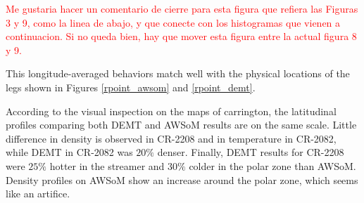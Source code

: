 \documentclass[namedreferences]{solarphysics}
\def\diego#1{\textcolor{red}{#1}}
\begin{document}
\begin{article}
\diego{Me gustaria hacer un comentario de cierre para esta figura que refiera las Figuras 3 y 9, como la linea de abajo, y que conecte con los histogramas que vienen a continuacion. Si no queda bien, hay que mover esta figura entre la actual figura 8 y 9.}

This longitude-averaged behaviors match well with the physical locations of the legs shown in Figures \ref{rpoint_awsom} and \ref{rpoint_demt}.

According to the visual inspection on the maps of carrington, the latitudinal profiles comparing both DEMT and AWSoM results are on the same scale. Little difference in density is observed in CR-2208 and in temperature in CR-2082, while DEMT in CR-2082 was $20\%$ denser. Finally, DEMT results for CR-2208 were $25\%$ hotter in the streamer and $30\%$ colder in the polar zone than AWSoM.
Density profiles on AWSoM show an increase around the polar zone, which seems like an artifice.



\end{article}
\end{document}
